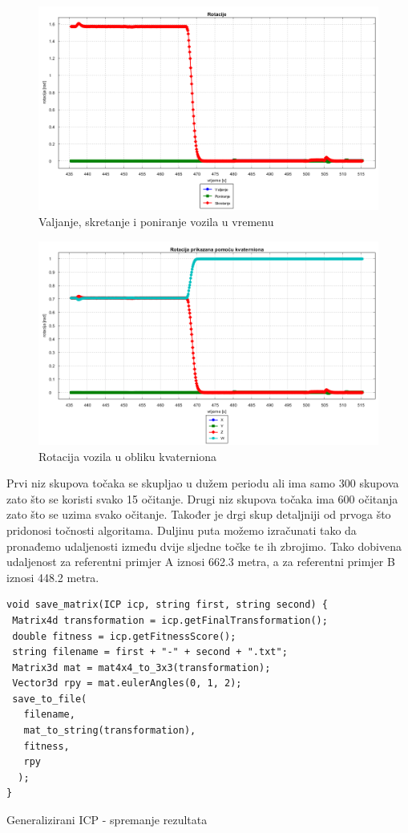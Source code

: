 \begin{figure}[H]
  \includegraphics[scale=0.35]{images/rotacija_vrijeme2.png}
  \caption{Valjanje, skretanje i poniranje vozila u vremenu}
  \label{fig:gt2_rot_vr}
\end{figure}
\begin{figure}[H]
  \includegraphics[scale=0.35]{images/rotacija_kvaterni2.png}
  \caption{Rotacija vozila u obliku kvaterniona}
  \label{fig:gt2_rot_kv}
\end{figure}
Prvi niz skupova točaka se skupljao u dužem periodu ali ima samo 300 skupova zato što se koristi svako 15 očitanje. Drugi niz skupova točaka ima 600 očitanja zato što se uzima svako očitanje. Također je drgi skup detaljniji od prvoga što pridonosi točnosti algoritama. Duljinu puta možemo izračunati tako da pronađemo udaljenosti između dvije sljedne točke te ih zbrojimo. Tako dobivena udaljenost za referentni primjer A iznosi 662.3 metra, a za referentni primjer B iznosi 448.2 metra.

\begin{listing}[H]
  \begin{verbatim}
void save_matrix(ICP icp, string first, string second) {
 Matrix4d transformation = icp.getFinalTransformation();
 double fitness = icp.getFitnessScore();
 string filename = first + "-" + second + ".txt";
 Matrix3d mat = mat4x4_to_3x3(transformation);
 Vector3d rpy = mat.eulerAngles(0, 1, 2);
 save_to_file(
   filename,
   mat_to_string(transformation),
   fitness,
   rpy
  );
}
  \end{verbatim}
  \caption{Generalizirani ICP - spremanje rezultata}
  \label{coderef:gen_icp_save_matrix}
\end{listing}

